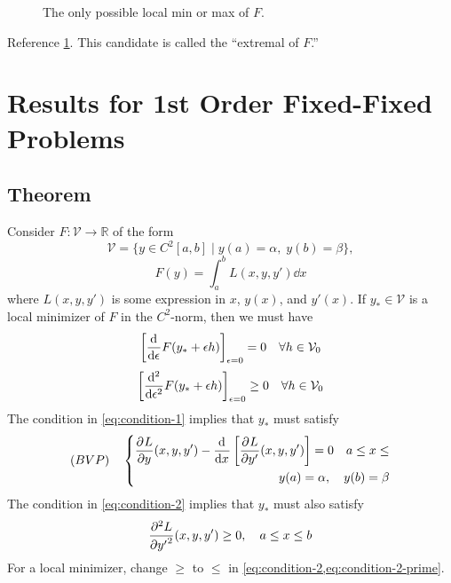\documentclass[12pt,twoside]{article}
\begin{document}
\begin{enumerate}
\begin{figure}[ht]
  \centering
  \caption{The only possible local min or max of $F$.}
  \label{fig:extremal}
\end{figure}
Reference \cref{fig:extremal}. This candidate is called the ``extremal of $F$.''
\end{enumerate}

\section{Results for 1st Order Fixed-Fixed Problems}
\subsection{Theorem}
Consider $F:\mathcal{V}\rightarrow\mathbb{R}$ of the form
$$\mathcal{V}=\{y\in C^2[a,b]\;|\;y(a)=\alpha,\;y(b)=\beta\},$$
$$F(y)=\int_a^bL(x,y,y')\dd{x}$$
where $L(x,y,y')$ is some expression in $x$, $y(x)$, and $y'(x)$.
If $y_*\in\mathcal{V}$ is a local minimizer of $F$ in the $C^2$-norm, then we
must have
\begin{equation}
  \label{eq:condition-1}
  \left[\od{}{\epsilon}F(y_*+\epsilon h)\right]_{\epsilon=0}=0\quad\forall h\in\mathcal{V}_0
\end{equation}
\begin{equation}
  \label{eq:condition-2}
  \left[\od[2]{}{\epsilon}F(y_*+\epsilon h)\right]_{\epsilon=0}\ge0  \quad\forall h\in\mathcal{V}_0
\end{equation}
The condition in \cref{eq:condition-1} implies that $y_*$ must satisfy
\begin{equation}
  \label{eq:condition-1-prime}
  (BVP)\quad\left\{
  \begin{aligned}
    \pd{L}{y}(x,y,y')-\od{}{x}\left[ \pd{L}{y'}(x,y,y') \right]=0\quad a\le x\le \\
    y(a) = \alpha,\quad y(b)=\beta
  \end{aligned} \right.
\end{equation}
The condition in \cref{eq:condition-2} implies that $y_*$ must also satisfy
\begin{equation}
  \label{eq:condition-2-prime}
  \pd[2]{L}{y'}(x,y,y')\ge0,\quad a\le x \le b
\end{equation}
For a local minimizer, change $\ge$ to $\le$ in \cref{eq:condition-2,eq:condition-2-prime}.
\end{document}

